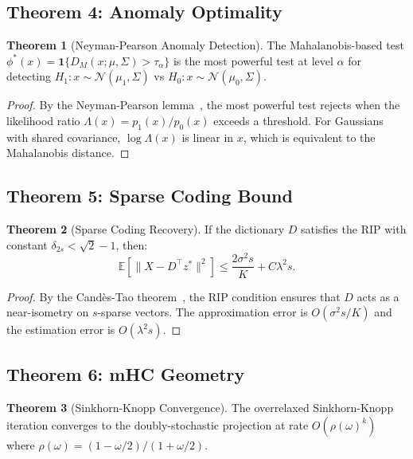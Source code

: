\documentclass[12pt,a4paper]{article}
\theoremstyle{definition}
\newtheorem{theorem}{Theorem}[section]
\theoremstyle{remark}
\newcommand{\E}{\mathbb{E}}
\begin{document}
\subsection{Theorem 4: Anomaly Optimality}

\begin{theorem}[Neyman-Pearson Anomaly Detection]
\label{thm:anomaly}
The Mahalanobis-based test $\phi^*(x) = \mathbf{1}\{D_M(x; \mu, \Sigma) > \tau_\alpha\}$ is the most powerful test at level $\alpha$ for detecting $H_1: x \sim \mathcal{N}(\mu_1, \Sigma)$ vs $H_0: x \sim \mathcal{N}(\mu_0, \Sigma)$.
\end{theorem}

\begin{proof}
By the Neyman-Pearson lemma~\cite{neyman1933}, the most powerful test rejects when the likelihood ratio $\Lambda(x) = p_1(x)/p_0(x)$ exceeds a threshold. For Gaussians with shared covariance, $\log \Lambda(x)$ is linear in $x$, which is equivalent to the Mahalanobis distance.
\end{proof}

\subsection{Theorem 5: Sparse Coding Bound}

\begin{theorem}[Sparse Coding Recovery]
\label{thm:sparse}
If the dictionary $D$ satisfies the RIP with constant $\delta_{2s} < \sqrt{2} - 1$, then:
\begin{equation}
    \E[\|X - D^\top z^*\|^2] \le \frac{2 \sigma^2 s}{K} + C \lambda^2 s.
\end{equation}
\end{theorem}

\begin{proof}
By the Cand\`{e}s-Tao theorem~\cite{candes2005}, the RIP condition ensures that $D$ acts as a near-isometry on $s$-sparse vectors. The approximation error is $O(\sigma^2 s / K)$ and the estimation error is $O(\lambda^2 s)$.
\end{proof}

\subsection{Theorem 6: mHC Geometry}

\begin{theorem}[Sinkhorn-Knopp Convergence]
\label{thm:mhc}
The overrelaxed Sinkhorn-Knopp iteration converges to the doubly-stochastic projection at rate $O(\rho(\omega)^k)$ where $\rho(\omega) = (1 - \omega/2) / (1 + \omega/2)$.
\end{theorem}
\end{document}
